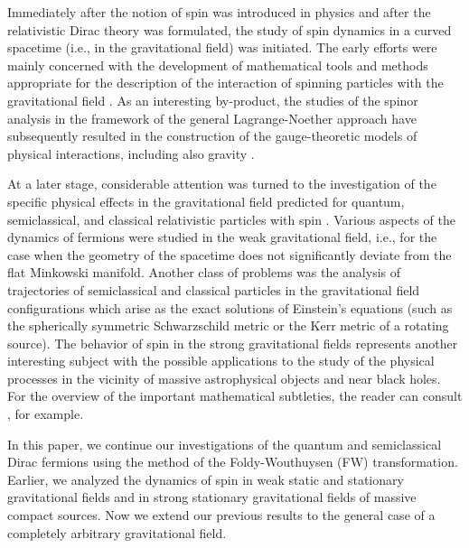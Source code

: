 \documentclass[preprint,showpacs,preprintnumbers,eqsecnum,amsmath,amssymb]{revtex4-1}
\begin{document}
Immediately after the notion of spin was introduced in physics and after the
relativistic Dirac theory was formulated, the study of spin dynamics in a curved
spacetime (i.e., in the gravitational field) was initiated. The early efforts were
mainly concerned with the development of mathematical tools and methods appropriate
for the description of the interaction of spinning particles with the gravitational
field \cite{Tetrode,Weyl29,FockIvan,Fock,VDW,Schr,Bargmann,IVDW,Bade,Brill57,VDW60}.
As an interesting by-product, the studies of the spinor analysis in the framework of
the general Lagrange-Noether approach have subsequently resulted in the construction
of the gauge-theoretic models of physical interactions, including also gravity
\cite{Weyl50,Sciama,Kibble,HonnefH,Reader}.

At a later stage, considerable attention was turned to the investigation of
the specific physical effects in the gravitational field predicted for quantum,
semiclassical, and classical relativistic particles with spin
\cite{Oliveira,KO,Lich,Brill66,wong,kann,aud,rudiger,d4,d6,d7,d8,d9,d10,kiefer,goss}.
Various aspects of the dynamics of fermions were studied in the weak gravitational
field, i.e., for the case when the geometry of the spacetime does not significantly
deviate from the flat Minkowski manifold. Another class of problems was the analysis
of trajectories of semiclassical and classical particles in the gravitational field
configurations which arise as the exact solutions of Einstein's equations (such as
the spherically symmetric Schwarzschild metric or the Kerr metric of a rotating
source). The behavior of spin in the strong gravitational fields represents another
interesting subject with the possible applications to the study of the physical
processes in the vicinity of massive astrophysical objects and near black holes.
For the overview of the important mathematical subtleties, the reader can consult
\cite{Benn,esposito,Friedrich,NiRev}, for example.

In this paper, we continue our investigations of the quantum and semiclassical
Dirac fermions using the method of the Foldy-Wouthuysen (FW) transformation. Earlier,
we analyzed the dynamics of spin in weak static and stationary gravitational fields
\cite{PRD,PRD2,Warszawa,OST} and in strong stationary gravitational fields
\cite{ostrong} of massive compact sources. Now we extend our previous results
to the general case of a completely arbitrary gravitational field.
\end{document}
